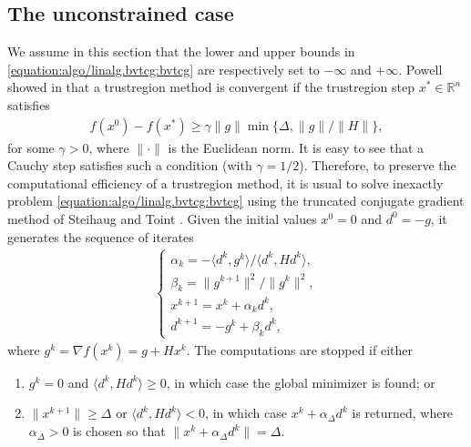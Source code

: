 \documentclass[letterpaper,10pt,english]{sphinxmanual}
\newcommand{\norm}[2][]{#1\lVert#2#1\rVert}
\newcommand{\set}[2][]{#1\{#2#1\}}
\newcommand{\inner}[2][]{#1\langle#2#1\rangle}
\def\R{\ensuremath{\mathds{R}}}
\begin{document}
\subsection{The unconstrained case}
\label{\detokenize{algo/linalg.bvtcg:the-unconstrained-case}}\label{\detokenize{algo/linalg.bvtcg:tcg-base}}
\sphinxAtStartPar
We assume in this section that the lower and upper bounds in \eqref{equation:algo/linalg.bvtcg:bvtcg} are
respectively set to \(-\infty\) and \(+\infty\). Powell showed in
 that a trust\sphinxhyphen{}region method is convergent if the trust\sphinxhyphen{}region step
\(x^{\ast} \in \R^n\) satisfies
\begin{equation*}
\begin{split}f(x^0) - f(x^{\ast}) \ge \gamma \norm{g} \min \set{\Delta, \norm{g} / \norm{H}},\end{split}
\end{equation*}
\sphinxAtStartPar
for some \(\gamma > 0\), where \(\norm{\cdot}\) is the Euclidean norm.
It is easy to see that a Cauchy step satisfies such a condition
(with \(\gamma = 1/2\)). Therefore, to preserve the computational
efficiency of a trust\sphinxhyphen{}region method, it is usual to solve inexactly problem
\eqref{equation:algo/linalg.bvtcg:bvtcg} using the truncated conjugate gradient method of Steihaug 
and Toint . Given the initial values \(x^0 = 0\) and
\(d^0 = -g\), it generates the sequence of iterates
\begin{equation*}
\begin{split}\left\{
\begin{array}{l}
    \alpha_k = -\inner{d^k, g^k} / \inner{d^k, Hd^k},\\
    \beta_k = \norm{g^{k + 1}}^2 / \norm{g^k}^2,\\
    x^{k + 1} = x^k + \alpha_k d^k,\\
    d^{k + 1} = -g^k + \beta_k d^k,
\end{array}
\right.\end{split}
\end{equation*}
\sphinxAtStartPar
where \(g^k = \nabla f(x^k) = g + Hx^k\). The computations are stopped if
either
\begin{enumerate}
%
\item {} 
\sphinxAtStartPar
\(g^k = 0\) and \(\inner{d^k, Hd^k} \ge 0\), in which case the
global minimizer is found; or

\item {} 
\sphinxAtStartPar
\(\norm{x^{k + 1}} \ge \Delta\) or \(\inner{d^k, Hd^k} < 0\), in
which case \(x^k + \alpha_{\Delta} d^k\) is returned, where
\(\alpha_{\Delta} > 0\) is chosen so that
\(\norm{x^k + \alpha_{\Delta} d^k} = \Delta\).

\end{enumerate}
\end{document}
